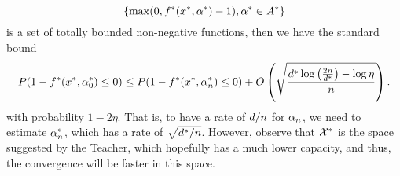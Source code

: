 $$\left\{\max(0, f^*(x^*, \alpha^*)- 1), \alpha^* \in A^*\right\}$$
 is a set of totally bounded non-negative functions, then we have the standard bound~\cite{vapnik2013nature}
\begin{equation}
    \nonumber
    P(1 - f^*(x^*, \alpha^*_0) \leq 0) \leq P(1 - f^*(x^*, \alpha^*_n) \leq 0) + O\left( \sqrt{\frac{d^* \log\left(\frac{2n}{d^*} \right) - \log\eta}{n}}  \right) .
\end{equation}
with probability $1 - 2\eta$.
That is, to have a rate of $d/n$ for $\alpha_n$, we need to estimate $\alpha^*_n$, which has a rate of $\sqrt{d^*/n}$. However, observe that $\mathcal{X}^*$ is the space suggested by the Teacher, which hopefully has a much lower capacity, and thus, the convergence will be faster in this space.

